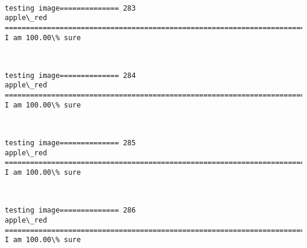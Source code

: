\documentclass[11pt]{article}
\begin{document}
    \begin{center}
    \end{center}
    { \hspace*{\fill} \\}
    
    \begin{Verbatim}[commandchars=\\\{\}]
testing image============== 283
apple\_red
============================================================================
I am 100.00\% sure

    \end{Verbatim}

    \begin{center}
    \end{center}
    { \hspace*{\fill} \\}
    
    \begin{Verbatim}[commandchars=\\\{\}]
testing image============== 284
apple\_red
============================================================================
I am 100.00\% sure

    \end{Verbatim}

    \begin{center}
    \end{center}
    { \hspace*{\fill} \\}
    
    \begin{Verbatim}[commandchars=\\\{\}]
testing image============== 285
apple\_red
============================================================================
I am 100.00\% sure

    \end{Verbatim}

    \begin{center}
    \end{center}
    { \hspace*{\fill} \\}
    
    \begin{Verbatim}[commandchars=\\\{\}]
testing image============== 286
apple\_red
============================================================================
I am 100.00\% sure

    \end{Verbatim}
\end{document}
